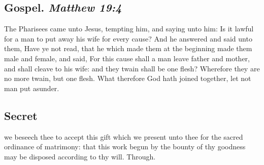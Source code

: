 
\subsection{Gospel. {\itshape Matthew 19:4}}
 The Pharisees came unto Jesus, tempting him, and saying unto him: Is it lawful for a man to put away his wife for every cause? And he answered and said unto them, Have ye not read, that he which made them at the beginning made them male and female, and said, For this cause shall a man leave father and mother, and shall cleave to his wife: and they twain shall be one flesh? Wherefore they are no more twain, but one flesh. What therefore God hath joined together, let not man put asunder.


\subsection{Secret}
 we beseech thee to accept this gift which we present unto thee for the sacred ordinance of matrimony: that this work begun by the bounty of thy goodness may be disposed according to thy will. Through.

